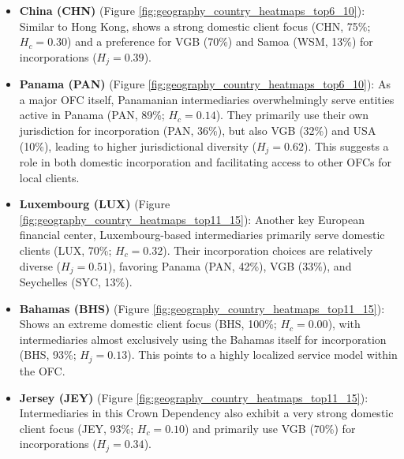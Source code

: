 \begin{itemize}
    \item \textbf{China (CHN)} (Figure \ref{fig:geography_country_heatmaps_top6_10}): Similar to Hong Kong, shows a strong domestic client focus (CHN, 75\%; $H_c=0.30$) and a preference for VGB (70\%) and Samoa (WSM, 13\%) for incorporations ($H_j=0.39$).

    \item \textbf{Panama (PAN)} (Figure \ref{fig:geography_country_heatmaps_top6_10}): As a major OFC itself, Panamanian intermediaries overwhelmingly serve entities active in Panama (PAN, 89\%; $H_c=0.14$). They primarily use their own jurisdiction for incorporation (PAN, 36\%), but also VGB (32\%) and USA (10\%), leading to higher jurisdictional diversity ($H_j=0.62$). This suggests a role in both domestic incorporation and facilitating access to other OFCs for local clients.

    \item \textbf{Luxembourg (LUX)} (Figure \ref{fig:geography_country_heatmaps_top11_15}): Another key European financial center, Luxembourg-based intermediaries primarily serve domestic clients (LUX, 70\%; $H_c=0.32$). Their incorporation choices are relatively diverse ($H_j=0.51$), favoring Panama (PAN, 42\%), VGB (33\%), and Seychelles (SYC, 13\%).

    \item \textbf{Bahamas (BHS)} (Figure \ref{fig:geography_country_heatmaps_top11_15}): Shows an extreme domestic client focus (BHS, 100\%; $H_c=0.00$), with intermediaries almost exclusively using the Bahamas itself for incorporation (BHS, 93\%; $H_j=0.13$). This points to a highly localized service model within the OFC.

    \item \textbf{Jersey (JEY)} (Figure \ref{fig:geography_country_heatmaps_top11_15}): Intermediaries in this Crown Dependency also exhibit a very strong domestic client focus (JEY, 93\%; $H_c=0.10$) and primarily use VGB (70\%) for incorporations ($H_j=0.34$).
\end{itemize}


